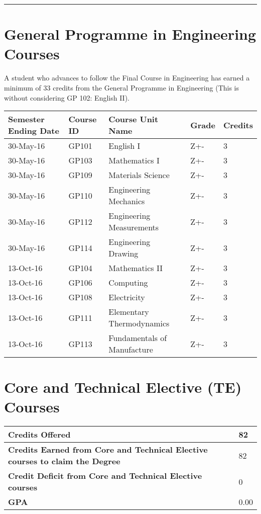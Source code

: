 \documentclass[12pt]{article}
\begin{document}
\noindent\rule{\textwidth}{1pt}

\vspace{-20pt}

\section*{General Programme in Engineering Courses}

A student who advances to follow the Final Course in Engineering has earned a minimum of 33 credits from the General Programme in Engineering (This is without considering GP 102: English II).

\begin{table}[h]
\begin{tabularx}{\textwidth}{|X|l|l|l|l|}
\hline 
\textbf{Semester Ending Date} & \textbf{Course ID} & \textbf{Course Unit Name} & \textbf{Grade} & \textbf{Credits} \\ 
\hline
30-May-16 & GP101 & English I & Z+- & 3 \\ 
\hline
30-May-16 & GP103 & Mathematics I & Z+- & 3 \\ 
\hline
30-May-16 & GP109 & Materials Science & Z+- & 3 \\ 
\hline
30-May-16 & GP110 & Engineering Mechanics & Z+- & 3 \\ 
\hline
30-May-16 & GP112 & Engineering Measurements & Z+- & 3 \\ 
\hline
30-May-16 & GP114 & Engineering Drawing & Z+- & 3 \\ 
\hline
13-Oct-16 & GP104 & Mathematics II & Z+- & 3 \\ 
\hline
13-Oct-16 & GP106 & Computing & Z+- & 3 \\ 
\hline
13-Oct-16 & GP108 & Electricity & Z+- & 3 \\ 
\hline
13-Oct-16 & GP111 & Elementary Thermodynamics & Z+- & 3 \\ 
\hline
13-Oct-16 & GP113 & Fundamentals of Manufacture & Z+- & 3 \\ 
\hline
\end{tabularx}
\end{table}

\vspace{-10pt}

\section*{Core and Technical Elective (TE) Courses}

\begin{tabularx}{\textwidth}{|X|l|}
\hline 
\textbf{Credits Offered} & 82 \\ \hline 
\textbf{Credits Earned from Core and Technical Elective courses to claim the Degree} & 82 \\ \hline 
\textbf{Credit Deficit from Core and Technical Elective courses} & 0 \\
\hline 
\textbf{GPA} & 0.00 \\
\hline 
\end{tabularx}
\end{document}

